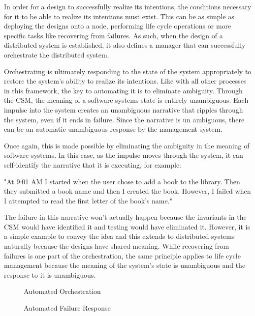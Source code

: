 In order for a design to successfully realize its intentions, the conditions necessary for it to be able to realize its intentions must exist. This can be as simple as deploying the designs onto a node, performing life cycle operations or more specific tasks like recovering from failures. As such, when the design of a distributed system is established, it also defines a manager that can successfully orchestrate the distributed system.

Orchestrating is ultimately responding to the state of the system appropriately to restore the system's ability to realize its intentions. Like with all other processes in this framework, the key to automating it is to eliminate ambiguity. Through the CSM, the meaning of a software systems state is entirely unambiguous. Each impulse into the system creates an unambiguous narrative that ripples through the system, even if it ends in failure. Since the narrative is un ambiguous, there can be an automatic unambiguous response by the management system.

Once again, this is made possible by eliminating the ambiguity in the meaning of software systems. In this case, as the impulse moves through the system, it can self-identify the narrative that it is executing, for example:

"At 9:01 AM I started when the user chose to add a book to the library. Then they submitted a book name and then I created the book. However, I failed when I attempted to read the first letter of the book's name."

The failure in this narrative won't actually happen because the invariants in the CSM would have identified it and testing would have eliminated it. However, it is a simple example to convey the idea and this extends to distributed systems naturally because the designs have shared meaning. While recovering from failures is one part of the orchestration, the same principle applies to life cycle management because the meaning of the system's state is unambiguous and the response to it is unambiguous.

\begin{figure}[htbp]
    
    \caption{Automated Orchestration}
    \label{fig:automated_orchestration}
\end{figure}

\begin{figure}[htbp]
    
    \caption{Automated Failure Response}
    \label{fig:automated_failure_response}
\end{figure}

